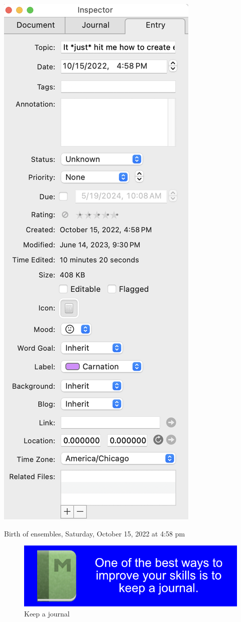 \documentclass[
]{book}
\begin{document}
\includegraphics{_book/images/Journal_birth_of_ensembles.png}

Birth of ensembles, Saturday, October 15, 2022 at 4:58 pm

\begin{figure}
\centering
\includegraphics{_book/images/Keep_a_journal.jpg}
\caption{Keep a journal}
\end{figure}
\end{document}
